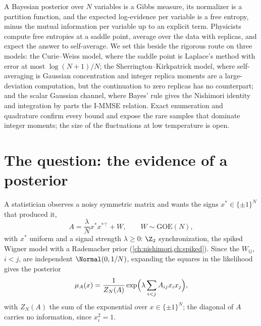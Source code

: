 \newcommand{\freeentropymmse}{\mathrm{mmse}}
\newcommand{\freeentropyEnt}{\operatorname{Ent}}

\begin{refsection}

\begin{chaptersummary}
A Bayesian posterior over $N$ variables is a Gibbs measure, its normalizer is a partition function, and the expected log-evidence per variable is a free entropy, minus the mutual information per variable up to an explicit term. Physicists compute free entropies at a saddle point, average over the data with replicas, and expect the answer to self-average. We set this beside the rigorous route on three models: the Curie--Weiss model, where the saddle point is Laplace's method with error at most $\log(N+1)/N$; the Sherrington--Kirkpatrick model, where self-averaging is Gaussian concentration and integer replica moments are a large-deviation computation, but the continuation to zero replicas has no counterpart; and the scalar Gaussian channel, where Bayes' rule gives the Nishimori identity and integration by parts the I-MMSE relation. Exact enumeration and quadrature confirm every bound and expose the rare samples that dominate integer moments; the size of the fluctuations at low temperature is open.
\end{chaptersummary}

\section{The question: the evidence of a posterior}\label{sec:freeentropy:question}

A statistician observes a noisy symmetric matrix and wants the signs $x^*\in\{\pm1\}^N$ that produced it,
\begin{equation}\label{eq:freeentropy:z2}
A=\frac\lambda Nx^*x^{*\top}+W,\qquad W\sim\mathrm{GOE}(N),
\end{equation}
with $x^*$ uniform and a signal strength $\lambda\ge0$: $\Z_2$ synchronization, the spiked Wigner model with a Rademacher prior (\cref{ch:nishimori,ch:spiked}). Since the $W_{ij}$, $i<j$, are independent $\Normal(0,1/N)$, expanding the squares in the likelihood gives the posterior
\begin{equation}\label{eq:freeentropy:z2post}
\mu_A(x)=\frac1{Z_N(A)}\exp\Bigl(\lambda\sum_{i<j}A_{ij}x_ix_j\Bigr),
\end{equation}
with $Z_N(A)$ the sum of the exponential over $x\in\{\pm1\}^N$; the diagonal of $A$ carries no information, since $x_i^2=1$.


\end{refsection}
